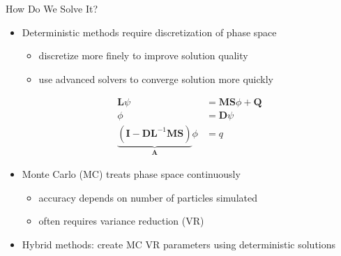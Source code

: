 \documentclass[xcolor=x11names,compress]{beamer}
\renewcommand{\(}{\begin{columns}}
\renewcommand{\)}{\end{columns}}
\newcommand{\<}[1]{\begin{column}{#1}}
\renewcommand{\>}{\end{column}}
\newcommand{\ve}[1]{\ensuremath{\mathbf{#1}}}
\begin{document}
\begin{frame}{How Do We Solve It?}
    
    \begin{itemize}
    \item \alert{Deterministic} methods require discretization of phase space
      \begin{itemize}
      \item discretize more finely to improve solution quality
      \item use advanced solvers to converge solution more quickly
      \end{itemize}
      \begin{align}
      \mathbf{L} \psi &= \mathbf{MS}\phi + \mathbf{Q} \nonumber\\
      \phi &= \mathbf{D}\psi \nonumber \\
      \underbrace{(\ve{I} - \ve{DL}^{-1}\ve{MS})}_{\mathbf{A}}\phi &= q\nonumber
      \end{align}
    \item \alert{Monte Carlo} (MC) treats phase space continuously
      \begin{itemize}
      \item accuracy depends on number of particles simulated
      \item often requires variance reduction (VR)
      \end{itemize}      
    \item \alert{Hybrid} methods: create MC VR parameters using deterministic solutions
    \end{itemize}
    
\end{frame}
\end{document}
